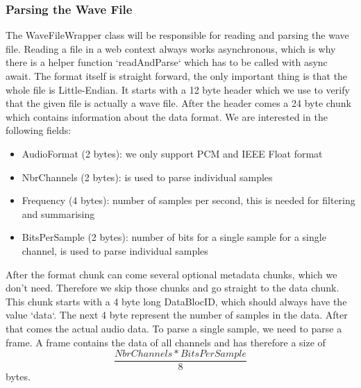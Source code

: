 \subsubsection{Parsing the Wave File}
The WaveFileWrapper class will be responsible for reading and parsing the wave file.
Reading a file in a web context always works asynchronous, which is why there is a helper function `readAndParse` which has to be called with async await.
The format itself is straight forward\cite{wav_file_format_wikipedia}, the only important thing is that the whole file is Little-Endian.
It starts with a 12 byte header which we use to verify that the given file is actually a wave file.
After the header comes a 24 byte chunk which contains information about the data format.
We are interested in the following fields:
\begin{itemize}
    \item AudioFormat (2 bytes): we only support PCM and IEEE Float format
    \item NbrChannels (2 bytes): is used to parse individual samples
    \item Frequency (4 bytes): number of samples per second, this is needed for filtering and summarising
    \item BitsPerSample (2 bytes): number of bits for a single sample for a single channel, is used to parse individual samples
\end{itemize}
After the format chunk can come several optional metadata chunks, which we don't need. Therefore we skip those chunks and go straight to the data chunk.
This chunk starts with a 4 byte long DataBlocID, which should always have the value `data`.
The next 4 byte represent the number of samples in the data.
After that comes the actual audio data.
To parse a single sample, we need to parse a frame.
A frame contains the data of all channels and has therefore a size of \[\frac{NbrChannels * BitsPerSample}{8}\] bytes.

